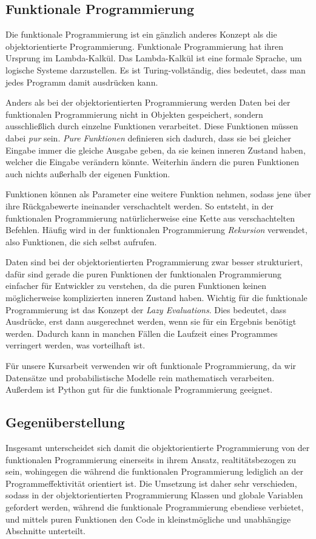 \documentclass[]{dsadokumentation}
\begin{document}
\subsection{Funktionale Programmierung}
Die funktionale Programmierung ist ein gänzlich anderes Konzept als die objektorientierte Programmierung. Funktionale Programmierung hat ihren Ursprung im Lambda-Kalkül. Das Lambda-Kalkül ist eine formale Sprache, um logische Systeme darzustellen. Es ist Turing-vollständig, dies bedeutet, dass man jedes Programm damit ausdrücken kann.

Anders als bei der objektorientierten Programmierung werden Daten bei der funktionalen Programmierung nicht in Objekten gespeichert, sondern ausschließlich durch einzelne Funktionen verarbeitet. Diese Funktionen müssen dabei \emph{pur} sein. \emph{Pure Funktionen} definieren sich dadurch, dass sie bei gleicher Eingabe immer die gleiche Ausgabe geben, da sie keinen inneren Zustand haben, welcher die Eingabe verändern könnte. Weiterhin ändern die puren Funktionen auch nichts außerhalb der eigenen Funktion.

Funktionen können als Parameter eine weitere Funktion nehmen, sodass jene über ihre Rückgabewerte ineinander verschachtelt werden. So entsteht, in der funktionalen Programmierung natürlicherweise eine Kette aus verschachtelten Befehlen. Häufig wird in der funktionalen Programmierung \emph{Rekursion} verwendet, also Funktionen, die sich selbst aufrufen.

Daten sind bei der objektorientierten Programmierung zwar besser strukturiert, dafür sind gerade die puren Funktionen der funktionalen Programmierung einfacher für Entwickler zu verstehen, da die puren Funktionen keinen möglicherweise komplizierten inneren Zustand haben. Wichtig für die funktionale Programmierung ist das Konzept der \emph{Lazy Evaluations}. Dies bedeutet, dass Ausdrücke, erst dann ausgerechnet werden, wenn sie für ein Ergebnis benötigt werden. Dadurch kann in manchen Fällen die Laufzeit eines Programmes verringert werden, was vorteilhaft ist.

Für unsere Kursarbeit verwenden wir oft funktionale Programmierung, da wir Datensätze und probabilistische Modelle rein mathematisch verarbeiten. Außerdem ist Python gut für die funktionale Programmierung geeignet.

\subsection{Gegenüberstellung}
Insgesamt unterscheidet sich damit die objektorientierte Programmierung von der funktionalen Programmierung einerseits in ihrem Ansatz, realtitätsbezogen zu sein, wohingegen die während die funktionalen Programmierung lediglich an der Programmeffektivität orientiert ist. Die Umsetzung ist daher sehr verschieden, sodass in der objektorientierten Programmierung Klassen und globale Variablen gefordert werden, während die funktionale Programmierung ebendiese verbietet, und mittels puren Funktionen den Code in kleinstmögliche und unabhängige Abschnitte unterteilt.
\end{document}
